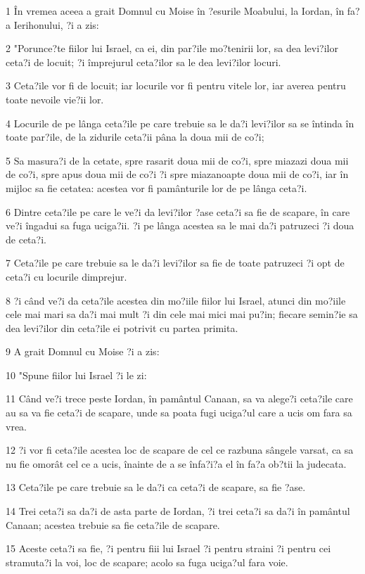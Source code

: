 \par 1 În vremea aceea a grait Domnul cu Moise în ?esurile Moabului, la Iordan, în fa?a Ierihonului, ?i a zis:
\par 2 "Porunce?te fiilor lui Israel, ca ei, din par?ile mo?tenirii lor, sa dea levi?ilor ceta?i de locuit; ?i împrejurul ceta?ilor sa le dea levi?ilor locuri.
\par 3 Ceta?ile vor fi de locuit; iar locurile vor fi pentru vitele lor, iar averea pentru toate nevoile vie?ii lor.
\par 4 Locurile de pe lânga ceta?ile pe care trebuie sa le da?i levi?ilor sa se întinda în toate par?ile, de la zidurile ceta?ii pâna la doua mii de co?i;
\par 5 Sa masura?i de la cetate, spre rasarit doua mii de co?i, spre miazazi doua mii de co?i, spre apus doua mii de co?i ?i spre miazanoapte doua mii de co?i, iar în mijloc sa fie cetatea: acestea vor fi pamânturile lor de pe lânga ceta?i.
\par 6 Dintre ceta?ile pe care le ve?i da levi?ilor ?ase ceta?i sa fie de scapare, în care ve?i îngadui sa fuga uciga?ii. ?i pe lânga acestea sa le mai da?i patruzeci ?i doua de ceta?i.
\par 7 Ceta?ile pe care trebuie sa le da?i levi?ilor sa fie de toate patruzeci ?i opt de ceta?i cu locurile dimprejur.
\par 8 ?i când ve?i da ceta?ile acestea din mo?iile fiilor lui Israel, atunci din mo?iile cele mai mari sa da?i mai mult ?i din cele mai mici mai pu?in; fiecare semin?ie sa dea levi?ilor din ceta?ile ei potrivit cu partea primita.
\par 9 A grait Domnul cu Moise ?i a zis:
\par 10 "Spune fiilor lui Israel ?i le zi:
\par 11 Când ve?i trece peste Iordan, în pamântul Canaan, sa va alege?i ceta?ile care au sa va fie ceta?i de scapare, unde sa poata fugi uciga?ul care a ucis om fara sa vrea.
\par 12 ?i vor fi ceta?ile acestea loc de scapare de cel ce razbuna sângele varsat, ca sa nu fie omorât cel ce a ucis, înainte de a se înfa?i?a el în fa?a ob?tii la judecata.
\par 13 Ceta?ile pe care trebuie sa le da?i ca ceta?i de scapare, sa fie ?ase.
\par 14 Trei ceta?i sa da?i de asta parte de Iordan, ?i trei ceta?i sa da?i în pamântul Canaan; acestea trebuie sa fie ceta?ile de scapare.
\par 15 Aceste ceta?i sa fie, ?i pentru fiii lui Israel ?i pentru straini ?i pentru cei stramuta?i la voi, loc de scapare; acolo sa fuga uciga?ul fara voie.
